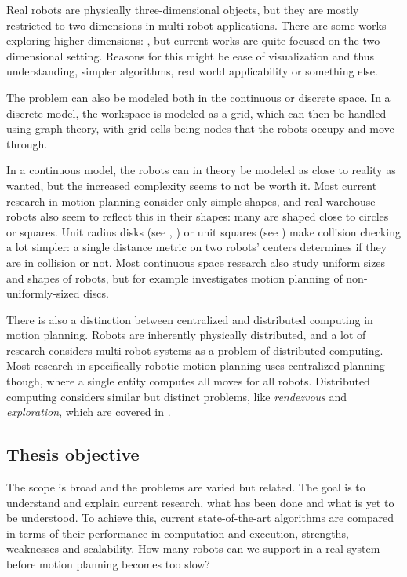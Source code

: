 Real robots are physically three-dimensional objects, but they are mostly restricted to two dimensions in multi-robot applications. There are some works exploring higher dimensions: \cite{arobots/TurpinMMK14}, but current works are quite focused on the two-dimensional setting. Reasons for this might be ease of visualization and thus understanding, simpler algorithms, real world applicability or something else.

The problem can also be modeled both in the continuous or discrete space. In a discrete model, the workspace is modeled as a grid, which can then be handled using graph theory, with grid cells being nodes that the robots occupy and move through.

In a continuous model, the robots can in theory be modeled as close to reality as wanted, but the increased complexity seems to not be worth it. Most current research in motion planning consider only simple shapes, and real warehouse robots also seem to reflect this in their shapes: many are shaped close to circles or squares. Unit radius disks (see \cite{siamcomp/DemaineFKMS19}, \cite{compgeom/BanyassadyBBBFH22}) or unit squares (see \cite{jea/YangV22}) make collision checking a lot simpler: a single distance metric on two robots' centers determines if they are in collision or not. Most continuous space research also study uniform sizes and shapes of robots, but for example \cite{fun/BrockenHKLS21} investigates motion planning of non-uniformly-sized discs.


There is also a distinction between centralized and distributed computing in motion planning. Robots are inherently physically distributed, and a lot of research considers multi-robot systems as a problem of distributed computing. Most research in specifically robotic motion planning uses centralized planning though, where a single entity computes all moves for all robots. Distributed computing considers similar but distinct problems, like \emph{rendezvous} and \emph{exploration}, which are covered in \cite{lncs/FlocchiniGN19}.






\subsection{Thesis objective}

The scope is broad and the problems are varied but related. The goal is to understand and explain current research, what has been done and what is yet to be understood. To achieve this, current state-of-the-art algorithms are compared in terms of their performance in computation and execution, strengths, weaknesses and scalability. How many robots can we support in a real system before motion planning becomes too slow? 
